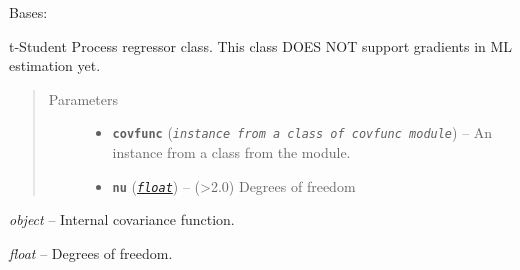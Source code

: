 \documentclass[letterpaper,10pt,english]{sphinxmanual}
\begin{document}
\begin{fulllineitems}
\label{pyGPGO.surrogates.tStudentProcess:pyGPGO.surrogates.tStudentProcess.tStudentProcess}
Bases: \href{https://docs.python.org/2/library/functions.html\#object}{}

t-Student Process regressor class. This class DOES NOT support gradients in ML estimation yet.
\begin{quote}\begin{description}
\item[{Parameters}] \leavevmode\begin{itemize}
\item {} 
\textbf{\texttt{covfunc}} (\emph{\texttt{instance from a class of covfunc module}}) -- An instance from a class from the  module.

\item {} 
\textbf{\texttt{nu}} (\href{https://docs.python.org/2/library/functions.html\#float}{\emph{\texttt{float}}}) -- (\textgreater{}2.0) Degrees of freedom

\end{itemize}

\end{description}\end{quote}

\begin{fulllineitems}
\label{pyGPGO.surrogates.tStudentProcess:pyGPGO.surrogates.tStudentProcess.tStudentProcess.covfunc}
\emph{object} -- Internal covariance function.

\end{fulllineitems}


\begin{fulllineitems}
\label{pyGPGO.surrogates.tStudentProcess:pyGPGO.surrogates.tStudentProcess.tStudentProcess.nu}
\emph{float} -- Degrees of freedom.

\end{fulllineitems}



\end{fulllineitems}
\end{document}
